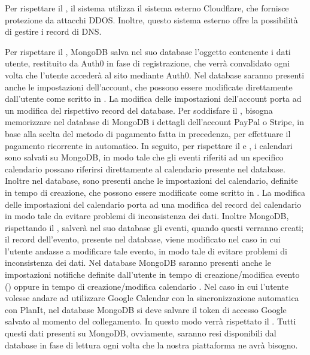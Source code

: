 \begin{listaPersonale}[DCO]{}
    Per rispettare il , il sistema utilizza il sistema esterno Cloudflare, che fornisce protezione da attacchi DDOS. Inoltre, questo sistema esterno offre la possibilità di gestire i record di DNS.

    Per rispettare il , MongoDB salva nel suo database l’oggetto contenente i dati utente, restituito da Auth0 in fase di registrazione, che verrà convalidato ogni volta che l’utente accederà al sito mediante Auth0. Nel database saranno presenti anche le impostazioni dell’account, che possono essere modificate direttamente dall’utente come scritto in .  La modifica delle impostazioni dell’account porta ad un modifica del rispettivo record del database. Per soddisfare il , bisogna memorizzare nel database di MongoDB i dettagli dell’account PayPal o Stripe, in base alla scelta del metodo di pagamento fatta in precedenza, per effettuare il pagamento ricorrente in automatico. In seguito, per rispettare il  e , i calendari sono salvati su MongoDB, in modo tale che gli eventi riferiti ad un specifico calendario possano riferirsi direttamente al calendario presente nel database. Inoltre nel database, sono presenti anche le impostazioni del calendario, definite in tempo di creazione, che possono essere modificate come scritto in . La modifica delle impostazioni del calendario porta ad una modifica del record del calendario in modo tale da evitare problemi di inconsistenza dei dati. Inoltre MongoDB, rispettando il , salverà nel suo database gli eventi, quando questi verranno creati; il record dell’evento, presente nel database, viene modificato nel caso in cui l’utente andasse a modificare tale evento, in modo tale di evitare problemi di inconsistenza dei dati. Nel database MongoDB saranno presenti anche le impostazioni notifiche definite dall’utente in tempo di creazione/modifica evento () oppure in tempo di creazione/modifica calendario . Nel caso in cui l’utente volesse andare ad utilizzare Google Calendar con la sincronizzazione automatica con PlanIt, nel database MongoDB si deve salvare il token di accesso Google salvato al momento del collegamento. In questo modo verrà rispettato il . Tutti questi dati presenti su MongoDB, ovviamente, saranno resi disponibili dal database in fase di lettura ogni volta che la nostra piattaforma ne avrà bisogno.



\end{listaPersonale}
